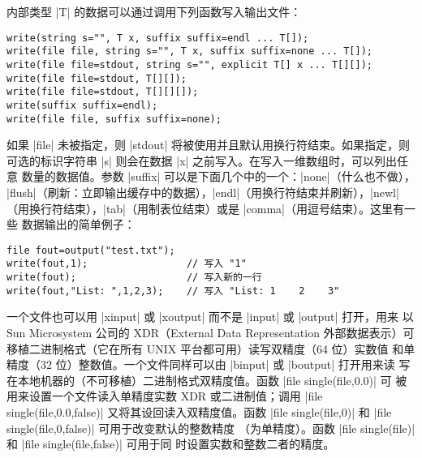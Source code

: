 \documentclass[nofonts,CJKnormalspaces]{ctexbook}[2009/05/20]
\newcommand*\prgname[1]{\textsf{#1}}
\begin{document}
内部类型 |T| 的数据可以通过调用下列函数写入输出文件：
\begin{lstlisting}
write(string s="", T x, suffix suffix=endl ... T[]);
write(file file, string s="", T x, suffix suffix=none ... T[]);
write(file file=stdout, string s="", explicit T[] x ... T[][]);
write(file file=stdout, T[][]);
write(file file=stdout, T[][][]);
write(suffix suffix=endl);
write(file file, suffix suffix=none);
\end{lstlisting}

如果 |file| 未被指定，则 |stdout| 将被使用并且默认用换行符结束。如果指定，则
可选的标识字符串 |s| 则会在数据 |x| 之前写入。在写入一维数组时，可以列出任意
数量的数据值。参数 |suffix| 可以是下面几个中的一个：|none|（什么也不做），
|flush|（刷新：立即输出缓存中的数据），|endl|（用换行符结束并刷新），|newl|
（用换行符结束），|tab|（用制表位结束）或是 |comma|（用逗号结束）。这里有一些
数据输出的简单例子：
\begin{lstlisting}
file fout=output("test.txt");
write(fout,1);                 // 写入 "1"
write(fout);                   // 写入新的一行
write(fout,"List: ",1,2,3);    // 写入 "List: 1    2    3"
\end{lstlisting}

一个文件也可以用 |xinput| 或 |xoutput| 而不是 |input| 或 |output| 打开，用来
以 Sun Microsystem 公司的 XDR（External Data Representation 外部数据表示）可
移植二进制格式（它在所有 \prgname{UNIX} 平台都可用）读写双精度（64 位）实数值
和单精度（32 位）整数值。一个文件同样可以由 |binput| 或 |boutput| 打开用来读
写在本地机器的（不可移植）二进制格式双精度值。函数 |file single(file,0.0)| 可
被用来设置一个文件读入单精度实数 XDR 或二进制值；调用
|file single(file,0.0,false)| 又将其设回读入双精度值。函数
|file single(file,0)| 和 |file single(file,0,false)| 可用于改变默认的整数精度
（为单精度）。函数 |file single(file)| 和 |file single(file,false)| 可用于同
时设置实数和整数二者的精度。
\end{document}
